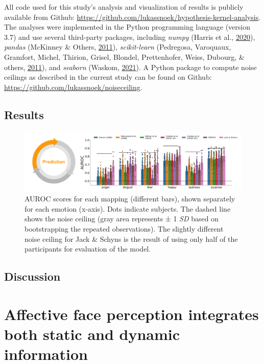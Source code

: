 \documentclass[11pt,american,a4paper,oneside,]{memoir} %
\begin{document}
All code used for this study's analysis and visualization of results is publicly available from Github: \url{https://github.com/lukassnoek/hypothesis-kernel-analysis}. The analyses were implemented in the Python programming language (version 3.7) and use several third-party packages, including \emph{numpy} (Harris et al., \protect\hyperlink{ref-Harris2020-en}{2020}), \emph{pandas} (McKinney \& Others, \protect\hyperlink{ref-McKinney2011-kl}{2011}), \emph{scikit-learn} (Pedregosa, Varoquaux, Gramfort, Michel, Thirion, Grisel, Blondel, Prettenhofer, Weiss, Dubourg, \& others, \protect\hyperlink{ref-pedregosa2011scikit}{2011}), and \emph{seaborn} (Waskom, \protect\hyperlink{ref-waskom2021seaborn}{2021}). A Python package to compute noise ceilings as described in the current study can be found on Github: \url{https://github.com/lukassnoek/noiseceiling}.

\hypertarget{hka-results}{%
\section{Results}\label{hka-results}}

\begin{figure}
\centering
\includegraphics{_bookdown_files/hypothesis-kernel-analysis-files/figures/figure_4.pdf}
\caption{\label{fig:fig-hka-4}AUROC scores for each mapping (different bars), shown separately for each emotion (x-axis). Dots indicate subjects. The dashed line shows the noise ceiling (gray area represents ± 1 \emph{SD} based on bootstrapping the repeated observations). The slightly different noise ceiling for Jack \& Schyns is the result of using only half of the participants for evaluation of the model.}
\end{figure}



\hypertarget{hka-discussion}{%
\section{Discussion}\label{hka-discussion}}

\hypertarget{static-vs-dynamic}{%
\chapter{Affective face perception integrates both static and dynamic information}\label{static-vs-dynamic}}
\end{document}
